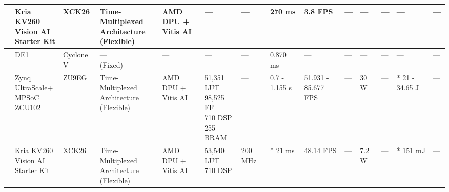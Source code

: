 \begin{center}
{\begin{tabular}{llllllllllllll}
\cite{ekbladResourceconstrainedFPGADesign2023} & \makecell[tl]{Kria KV260\\ Vision AI\\ Starter Kit} & XCK26 & \makecell[tl]{Time-Multiplexed\\ Architecture\\ (Flexible)} & \makecell[tl]{AMD DPU + \\Vitis AI} & --- & --- & 270 ms & 3.8 FPS & --- & --- & --- & --- & --- \\ \hline
\cite{carmeliAIBasedRealTimeStar2023} & DE1 & Cyclone V & \makecell[tl]{---\\ (Fixed)} & --- & --- & --- & 0.870 ms & --- & --- & --- & --- & --- & --- \\ \hline
\cite{cocaFPGAAcceleratorMetaRecognition2023} & \makecell[tl]{Zynq\\ UltraScale+\\ MPSoC\\ ZCU102} & ZU9EG & \makecell[tl]{Time-Multiplexed\\ Architecture\\ (Flexible)} & \makecell[tl]{AMD DPU + \\Vitis AI} & \makecell[tl]{51,351 LUT\\ 98,525 FF\\ 710 DSP\\ 255 BRAM} & --- & 0.7 - 1.155 s & \makecell[tl]{51.931 - 85.677\\ FPS} & --- & 30 W & --- & * 21 - 34.65 J & --- \\
\cite{zhaoHardwareAccelerationSatellite2023} & \makecell[tl]{Kria KV260\\ Vision AI\\ Starter Kit} & XCK26 & \makecell[tl]{Time-Multiplexed\\ Architecture\\ (Flexible)} & \makecell[tl]{AMD DPU + \\Vitis AI} & \makecell[tl]{53,540 LUT\\ 710 DSP} & 200 MHz & * 21 ms & 48.14 FPS & --- & 7.2 W & --- & * 151 mJ & --- \\ \hline

\end{tabular}}
\end{center}
